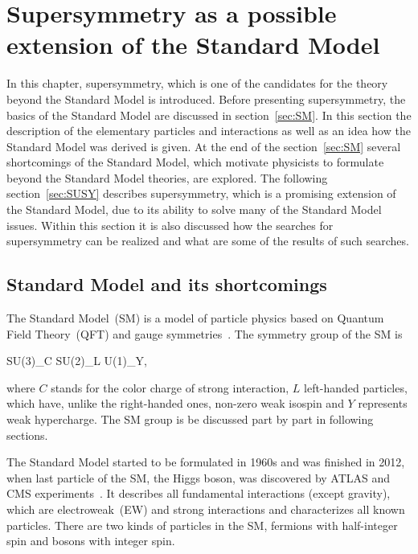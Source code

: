 \chapter{Supersymmetry as a possible extension of the Standard Model}

In this chapter, supersymmetry, which is one of the candidates for the theory beyond the Standard Model is introduced. Before presenting supersymmetry, the basics of the Standard Model are discussed in section~\ref{sec:SM}. In this section the description of the elementary particles and interactions as well as an idea how the Standard Model was derived is given. At the end of the section~\ref{sec:SM} several shortcomings of the Standard Model, which motivate physicists to formulate beyond the Standard Model theories, are explored. The following section~\ref{sec:SUSY} describes supersymmetry, which is a promising extension of the Standard Model, due to its ability to solve many of the Standard Model issues. Within this section it is also discussed how the searches for supersymmetry can be realized and what are some of the results of such searches. 

\section{Standard Model and its shortcomings~\label{sec:SM}}

The Standard Model~(SM) is a model of particle physics based on Quantum Field Theory~(QFT) and gauge symmetries~\cite{9783527406012}. The symmetry group of the SM is

{
SU(3)_{C} \otimes SU(2)_{L} \otimes U(1)_{Y},
}

where $C$ stands for the color charge of strong interaction, $L$ left-handed particles, which have, unlike the right-handed ones, non-zero weak isospin and $Y$ represents weak hypercharge. The SM group is be discussed part by part in following sections.

The Standard Model started to be formulated in 1960s and was finished in 2012, when last particle of the SM, the Higgs boson, was discovered by ATLAS and CMS experiments~\cite{Chatrchyan:2012xdj, Aad:2012tfa}. It describes all fundamental interactions (except gravity), which are electroweak~(EW) and strong interactions and characterizes all known particles. There are two kinds of particles in the SM, fermions with half-integer spin and bosons with integer spin.


